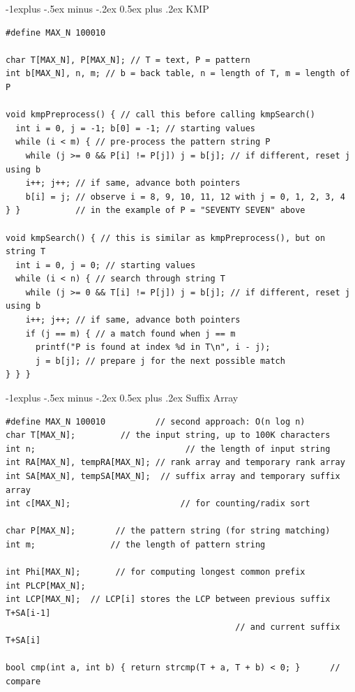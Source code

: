 \documentclass[10pt,landscape]{article}
\makeatletter
\renewcommand{\subsection}{\@startsection{subsection}{2}{0mm}%
                                {-1explus -.5ex minus -.2ex}%
                                {0.5ex plus .2ex}%
                                {\normalfont\normalsize\bfseries}}
\makeatother
\begin{document}
\begin{multicols}{2}
\subsection{KMP}
\begin{lstlisting}
#define MAX_N 100010

char T[MAX_N], P[MAX_N]; // T = text, P = pattern
int b[MAX_N], n, m; // b = back table, n = length of T, m = length of P

void kmpPreprocess() { // call this before calling kmpSearch()
  int i = 0, j = -1; b[0] = -1; // starting values
  while (i < m) { // pre-process the pattern string P
    while (j >= 0 && P[i] != P[j]) j = b[j]; // if different, reset j using b
    i++; j++; // if same, advance both pointers
    b[i] = j; // observe i = 8, 9, 10, 11, 12 with j = 0, 1, 2, 3, 4
} }           // in the example of P = "SEVENTY SEVEN" above

void kmpSearch() { // this is similar as kmpPreprocess(), but on string T
  int i = 0, j = 0; // starting values
  while (i < n) { // search through string T
    while (j >= 0 && T[i] != P[j]) j = b[j]; // if different, reset j using b
    i++; j++; // if same, advance both pointers
    if (j == m) { // a match found when j == m
      printf("P is found at index %d in T\n", i - j);
      j = b[j]; // prepare j for the next possible match
} } }
\end{lstlisting}

\subsection{Suffix Array}
\begin{lstlisting}
#define MAX_N 100010          // second approach: O(n log n)
char T[MAX_N];         // the input string, up to 100K characters
int n;                              // the length of input string
int RA[MAX_N], tempRA[MAX_N]; // rank array and temporary rank array
int SA[MAX_N], tempSA[MAX_N];  // suffix array and temporary suffix array
int c[MAX_N];                      // for counting/radix sort

char P[MAX_N];        // the pattern string (for string matching)
int m;               // the length of pattern string

int Phi[MAX_N];       // for computing longest common prefix
int PLCP[MAX_N];
int LCP[MAX_N];  // LCP[i] stores the LCP between previous suffix T+SA[i-1]
                                              // and current suffix T+SA[i]

bool cmp(int a, int b) { return strcmp(T + a, T + b) < 0; }      // compare


\end{lstlisting}
\end{multicols}
\end{document}
